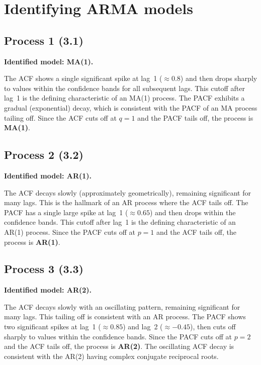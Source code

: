 \documentclass[11pt,a4paper]{article}
\begin{document}
\section{Identifying ARMA models}\label{sec:identification}

\subsection{Process 1 (3.1)}

\textbf{Identified model: MA(1).}

The ACF shows a single significant spike at lag~1 ($\approx 0.8$) and then
drops sharply to values within the confidence bands for all subsequent lags.
This cutoff after lag~1 is the defining characteristic of an MA(1) process.
The PACF exhibits a gradual (exponential) decay, which is consistent with the
PACF of an MA process tailing off. Since the ACF cuts off at $q = 1$ and the
PACF tails off, the process is \textbf{MA(1)}.

\subsection{Process 2 (3.2)}

\textbf{Identified model: AR(1).}

The ACF decays slowly (approximately geometrically), remaining significant for
many lags. This is the hallmark of an AR process where the ACF tails off.
The PACF has a single large spike at lag~1 ($\approx 0.65$) and then drops
within the confidence bands. This cutoff after lag~1 is the defining
characteristic of an AR(1) process. Since the PACF cuts off at $p = 1$ and the
ACF tails off, the process is \textbf{AR(1)}.

\subsection{Process 3 (3.3)}

\textbf{Identified model: AR(2).}

The ACF decays slowly with an oscillating pattern, remaining significant for
many lags. This tailing off is consistent with an AR process. The PACF shows
two significant spikes at lag~1 ($\approx 0.85$) and lag~2 ($\approx -0.45$),
then cuts off sharply to values within the confidence bands.
Since the PACF cuts off at $p = 2$ and the ACF tails off, the process is
\textbf{AR(2)}. The oscillating ACF decay is consistent with the AR(2) having
complex conjugate reciprocal roots.
\end{document}
